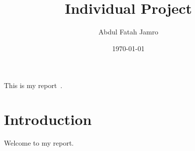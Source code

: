 \documentclass[a4paper, 12pt]{scrartcl}
\title{Individual Project}
\author{Abdul Fatah Jamro}
\date{\today}
\begin{document}
  
  \maketitle
  
  \noindent This is my report~\cite{md5}.

 

  \section{Introduction}

  Welcome to my report.

  
  
  
\end{document}
